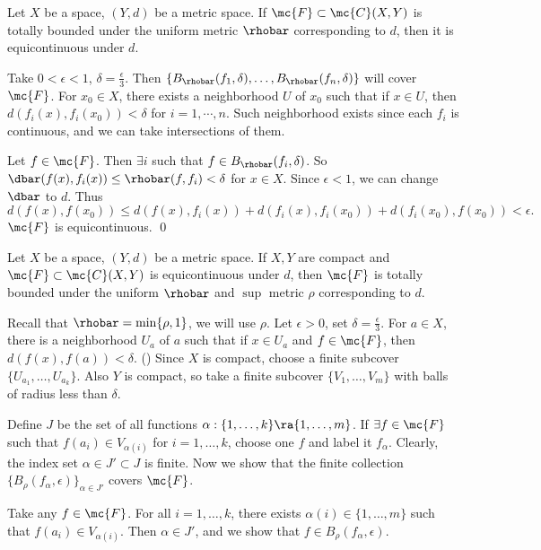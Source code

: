  Let \(X\) be a space, \((Y, d)\) be a metric space. If \(\mc{F} \subset \mc{C}(X, Y)\) is totally bounded under the uniform metric \(\rhobar\) corresponding to \(d\), then it is equicontinuous under \(d\).

\pf Take \(0 < \epsilon < 1\), \(\delta = \frac{\epsilon}{3}\). Then \(\{B_\rhobar(f_1, \delta), \dots, B_\rhobar(f_n, \delta)\}\) will cover \(\mc{F}\). For \(x_0 \in X\), there exists a neighborhood \(U\) of \(x_0\) such that if \(x \in U\), then \(d(f_i(x), f_i(x_0)) < \delta\) for \(i = 1, \cdots, n\). Such neighborhood exists since each \(f_i\) is continuous, and we can take intersections of them.

Let \(f \in \mc{F}\). Then \(\exists i\) such that \(f \in B_\rhobar(f_i, \delta)\). So \(\dbar(f(x), f_i(x)) \leq \rhobar(f, f_i) < \delta\) for \(x \in X\). Since \(\epsilon < 1\), we can change \(\dbar\) to \(d\). Thus
\[
    d(f(x), f(x_0)) \leq d(f(x), f_i(x)) + d(f_i(x), f_i(x_0)) + d(f_i(x_0), f(x_0)) < \epsilon.
\]
\(\mc{F}\) is equicontinuous. \qed

 Let \(X\) be a space, \((Y, d)\) be a metric space. If \(X, Y\) are compact and \(\mc{F} \subset \mc{C}(X, Y)\) is equicontinuous under \(d\), then \(\mc{F}\) is totally bounded under the uniform \(\rhobar\) and \(\sup\) metric \(\rho\) corresponding to \(d\).

\pf Recall that \(\rhobar = \min\{\rho, 1\}\), we will use \(\rho\). Let \(\epsilon > 0\), set \(\delta = \frac{\epsilon}{3}\). For \(a \in X\), there is a neighborhood \(U_a\) of \(a\) such that if \(x \in U_a\) and \(f \in \mc{F}\), then \(d(f(x), f(a)) < \delta\). (\mast) Since \(X\) is compact, choose a finite subcover \(\{U_{a_1}, \dots, U_{a_k}\}\). Also \(Y\) is compact, so take a finite subcover \(\{V_1, \dots, V_m\}\) with balls of radius less than \(\delta\).

Define \(J\) be the set of all functions \(\alpha : \{1, \dots, k\} \ra \{1, \dots, m\}\). If \(\exists f \in \mc{F}\) such that \(f(a_i) \in V_{\alpha(i)}\) for \(i = 1, \dots, k\), choose one \(f\) and label it \(f_\alpha\). Clearly, the index set \(\alpha \in J' \subset J\) is finite. Now we show that the finite collection \(\{B_\rho(f_\alpha, \epsilon)\}_{\alpha \in J'}\) covers \(\mc{F}\).

Take any \(f \in \mc{F}\). For all \(i = 1, \dots, k\), there exists \(\alpha(i) \in \{1, \dots, m\}\) such that \(f(a_i) \in V_{\alpha(i)}\). Then \(\alpha \in J'\), and we show that \(f \in B_\rho(f_\alpha, \epsilon)\).

